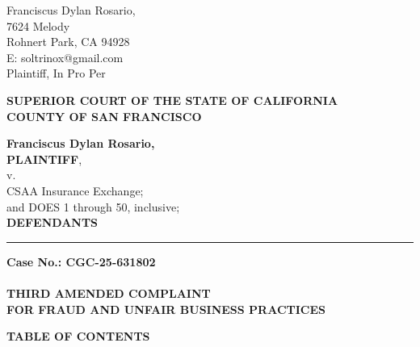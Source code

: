 

\nolinenumbers
\begin{singlespace}
Franciscus Dylan Rosario, \\
7624 Melody \\
Rohnert Park, CA 94928 \\
E: soltrinox@gmail.com \\
Plaintiff, In Pro Per \\
\end{singlespace}
\vspace*{9mm}
\begin{tightcenter}
\textbf{SUPERIOR COURT OF THE STATE OF CALIFORNIA} \\
\textbf{COUNTY OF SAN FRANCISCO}
\end{tightcenter}
\vspace*{2.25mm}
\nolinenumbers
\begin{minipage}[t]{3in}
    \raggedright
    \textbf{Franciscus Dylan Rosario,} \\ \textbf{PLAINTIFF}, \\
    \hspace{1cm} v. \\
    \small
    CSAA Insurance Exchange; \\
    and DOES 1 through 50, inclusive; \\
    \normalsize
    \textbf{DEFENDANTS}
    \makebox[3in]{\hrulefill}
\end{minipage}%
\hspace{3mm}
\begin{minipage}[t]{0.5pt}
    \vspace{0pt}
    \rule{0.5pt}{2.0in}
\end{minipage}
\hspace{3mm}
\begin{minipage}[t]{3in}
    \raggedright
    \noindent \textbf{Case No.: CGC-25-631802} \\
    ~\\
    \textbf{THIRD AMENDED COMPLAINT} \\
    \textbf{FOR FRAUD AND UNFAIR BUSINESS PRACTICES}
\end{minipage}
\vspace*{6mm}
\linenumbers
\begin{center}\textbf{TABLE OF CONTENTS}\end{center}
\vspace{2mm}
